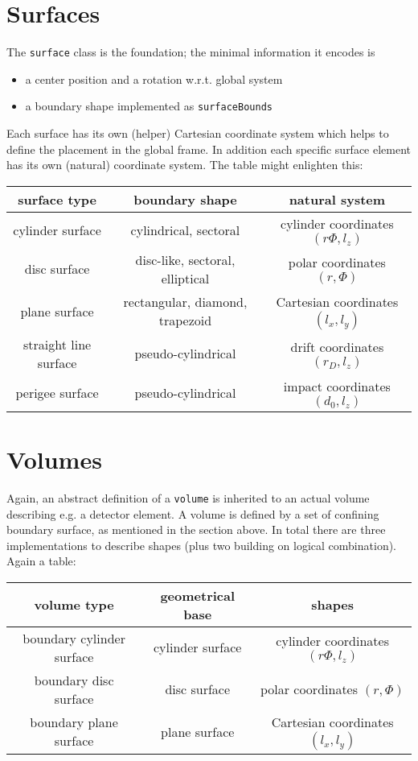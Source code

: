 \documentclass[12pt]{article}
\begin{document}
\section{Surfaces}
The {\tt surface} class is the foundation; the minimal information it encodes is
\begin{itemize}
    \item a center position and a rotation w.r.t. global system
    \item a boundary shape implemented as {\tt surfaceBounds}
\end{itemize}
Each surface has its own (helper) Cartesian coordinate system which helps to define the placement in the global frame.
In addition each specific surface element has its own (natural) coordinate system.
The table might enlighten this:\\
\begin{tabular}{|c|c|c|}
\hline
surface type          & boundary shape                  & natural system \\ \hline \hline
cylinder surface      & cylindrical, sectoral           & cylinder coordinates $(r\Phi, l_z) $ \\ \hline
disc surface          & disc-like, sectoral, elliptical & polar coordinates $(r, \Phi) $ \\ \hline
plane surface         & rectangular, diamond, trapezoid & Cartesian coordinates $(l_x, l_y) $ \\ \hline
straight line surface & pseudo-cylindrical              & drift coordinates  $(r_D, l_z) $ \\ \hline
perigee surface       & pseudo-cylindrical              & impact coordinates $(d_0,l_z) $ \\ \hline
\end{tabular}

\section{Volumes}
Again, an abstract definition of a {\tt volume} is inherited to an actual volume describing e.g. a detector element.
A volume is defined by a set of confining boundary surface, as mentioned in the section above.
In total there are three implementations to describe shapes (plus two building on logical combination).
Again a table:\\
\begin{tabular}{|c|c|c|}
\hline
volume type               & geometrical base & shapes \\ \hline \hline
boundary cylinder surface & cylinder surface & cylinder coordinates $(r\Phi, l_z) $ \\ \hline
boundary disc surface     & disc surface     & polar coordinates $(r, \Phi) $ \\ \hline
boundary plane surface    & plane surface    & Cartesian coordinates $(l_x, l_y) $ \\ \hline
\end{tabular}
\end{document}
